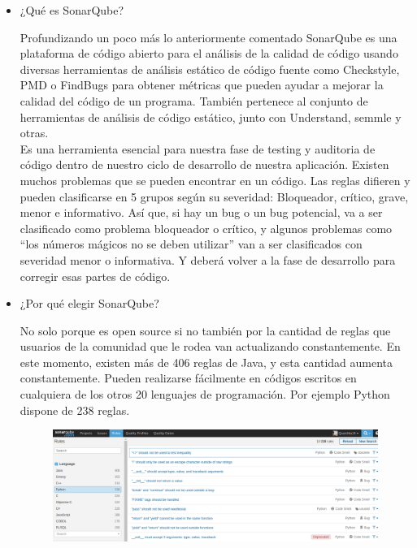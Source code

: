 \documentclass{report}
\begin{document}
		\begin{itemize}
			\item ¿Qué es SonarQube?
			
			Profundizando un poco más lo anteriormente comentado SonarQube es una plataforma de código abierto para el análisis de la calidad de código usando diversas herramientas de análisis estático de código fuente como Checkstyle, PMD o FindBugs para obtener métricas que pueden ayudar a mejorar la calidad del código de un programa. También pertenece al conjunto de herramientas de análisis de código estático, junto con Understand, semmle y otras.\\
			
			Es una herramienta esencial para nuestra fase de testing y auditoria de código dentro de nuestro ciclo de desarrollo de nuestra aplicación. Existen muchos problemas que se pueden encontrar en un código. Las reglas difieren y pueden clasificarse en 5 grupos según su severidad: Bloqueador, crítico, grave, menor e informativo. Así que, si hay un bug o un bug potencial, va a ser clasificado como problema bloqueador o crítico, y algunos problemas como “los números mágicos no se deben utilizar” van a ser clasificados con severidad menor o informativa. Y deberá volver a la fase de desarrollo para corregir esas partes de código.\\
			
			\item ¿Por qué elegir SonarQube?
			
			No solo porque es open source si no también por la cantidad de reglas que usuarios de la comunidad que le rodea van actualizando constantemente. En este momento, existen más de 406 reglas de Java, y esta cantidad aumenta constantemente. Pueden realizarse fácilmente en códigos escritos en cualquiera de los otros 20 lenguajes de programación. Por ejemplo Python dispone de 238 reglas.\\
			

			\begin{figure}[htb]
				\centering
				\includegraphics[width=1\textwidth]{img/ejemplo01.png}
				\label{fig:ejemplo}
			\end{figure}
			
			
		\end{itemize}
		
\end{document}
